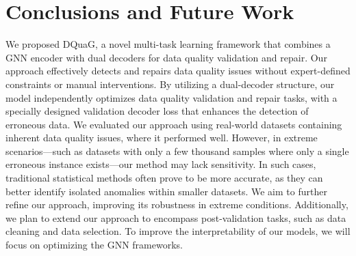 



\section{Conclusions and Future Work}
We proposed DQuaG, a novel multi-task learning framework that combines a GNN encoder with dual decoders for data quality validation and repair. 
Our approach effectively detects and repairs data quality issues without expert-defined constraints or manual interventions. By utilizing a dual-decoder structure, our model independently optimizes data quality validation and repair tasks, with a specially designed validation decoder loss that enhances the detection of erroneous data. 
We evaluated our approach using real-world datasets containing inherent data quality issues, where it performed well. However, in extreme scenarios—such as datasets with only a few thousand samples where only a single erroneous instance exists—our method may lack sensitivity. In such cases, traditional statistical methods often prove to be more accurate, as they can better identify isolated anomalies within smaller datasets. 
We aim to further refine our approach, improving its robustness in extreme conditions.
Additionally, we plan to extend our approach to encompass post-validation tasks, such as data cleaning and data selection. 
To improve the interpretability of our models, we will focus on optimizing the GNN frameworks.





